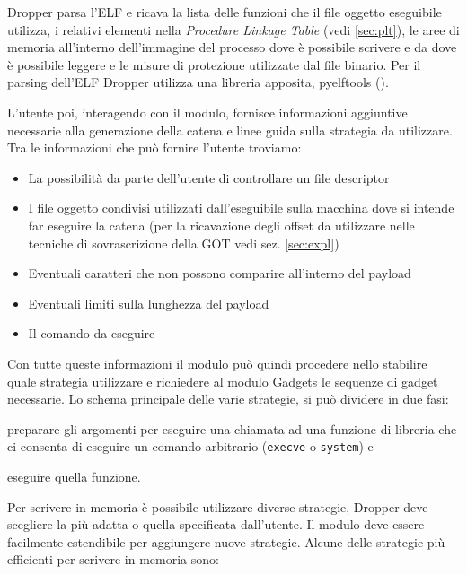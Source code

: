Dropper parsa l'ELF e ricava la lista delle funzioni che il file
oggetto eseguibile utilizza, i relativi elementi nella \emph{Procedure
  Linkage Table} (vedi \ref{sec:plt}), le aree di memoria all'interno
dell'immagine del processo dove è possibile scrivere e da dove è
possibile leggere e le misure di protezione utilizzate dal file
binario. Per il parsing dell'ELF Dropper utilizza una libreria
apposita, pyelftools (\cite{pyelftools}).

L'utente poi, interagendo con il modulo, fornisce informazioni
aggiuntive necessarie alla generazione della catena e linee guida
sulla strategia da utilizzare. Tra le informazioni che può fornire
l'utente troviamo:

\begin{itemize}
  \item La possibilità da parte dell'utente di controllare un file
    descriptor
  \item I file oggetto condivisi utilizzati dall'eseguibile sulla
    macchina dove si intende far eseguire la catena (per la
    ricavazione degli offset da utilizzare nelle tecniche di
    sovrascrizione della GOT vedi sez. \ref{sec:expl})
  \item Eventuali caratteri che non possono comparire all'interno del
    payload
  \item Eventuali limiti sulla lunghezza del payload
  \item Il comando da eseguire
\end{itemize}

Con tutte queste informazioni il modulo può quindi procedere nello
stabilire quale strategia utilizzare e richiedere al modulo
Gadgets le sequenze di gadget necessarie. Lo schema principale
delle varie strategie, si può dividere in due fasi: 

\begin{inparaenum}[1)]
\item preparare gli argomenti per eseguire una chiamata ad una
  funzione di libreria che ci consenta di eseguire un comando
  arbitrario (\lstinline{execve} o \lstinline{system}) e
\item eseguire quella
funzione.
\end{inparaenum}

Per scrivere in memoria è possibile utilizzare diverse strategie,
Dropper deve scegliere la più adatta o quella specificata
dall'utente. Il modulo deve essere facilmente estendibile per
aggiungere nuove strategie. Alcune delle strategie più efficienti per
scrivere in memoria sono:

